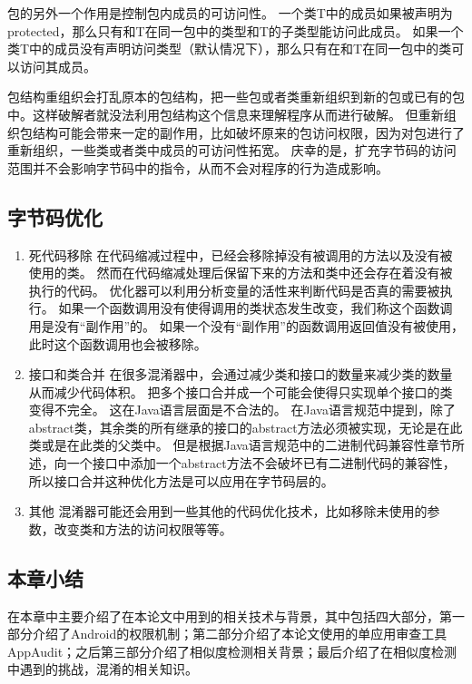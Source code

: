 包的另外一个作用是控制包内成员的可访问性。
一个类T中的成员如果被声明为protected，那么只有和T在同一包中的类型和T的子类型能访问此成员。
如果一个类T中的成员没有声明访问类型（默认情况下），那么只有在和T在同一包中的类可以访问其成员。

包结构重组织会打乱原本的包结构，把一些包或者类重新组织到新的包或已有的包中。这样破解者就没法利用包结构这个信息来理解程序从而进行破解。
但重新组织包结构可能会带来一定的副作用，比如破坏原来的包访问权限，因为对包进行了重新组织，一些类或者类中成员的可访问性拓宽。
庆幸的是，扩充字节码的访问范围并不会影响字节码中的指令，从而不会对程序的行为造成影响。

\subsection{字节码优化}

\begin{enumerate}
	\item 死代码移除
		在代码缩减过程中，已经会移除掉没有被调用的方法以及没有被使用的类。
		然而在代码缩减处理后保留下来的方法和类中还会存在着没有被执行的代码。
		优化器可以利用分析变量的活性来判断代码是否真的需要被执行。
		如果一个函数调用没有使得调用的类状态发生改变，我们称这个函数调用是没有“副作用”的。
		如果一个没有“副作用”的函数调用返回值没有被使用，此时这个函数调用也会被移除。
	\item 接口和类合并
		在很多混淆器中，会通过减少类和接口的数量来减少类的数量从而减少代码体积。
		把多个接口合并成一个可能会使得只实现单个接口的类变得不完全。
		这在Java语言层面是不合法的。
		在Java语言规范中提到，除了abstract类，其余类的所有继承的接口的abstract方法必须被实现，无论是在此类或是在此类的父类中。
		但是根据Java语言规范中的二进制代码兼容性章节所述，向一个接口中添加一个abstract方法不会破坏已有二进制代码的兼容性，所以接口合并这种优化方法是可以应用在字节码层的。
	\item 其他
		混淆器可能还会用到一些其他的代码优化技术，比如移除未使用的参数，改变类和方法的访问权限等等。
\end{enumerate}

\subsection{本章小结}
\label{sec:background-conclusion}

在本章中主要介绍了在本论文中用到的相关技术与背景，其中包括四大部分，第一部分介绍了Android的权限机制；第二部分介绍了本论文使用的单应用审查工具AppAudit；之后第三部分介绍了相似度检测相关背景；最后介绍了在相似度检测中遇到的挑战，混淆的相关知识。